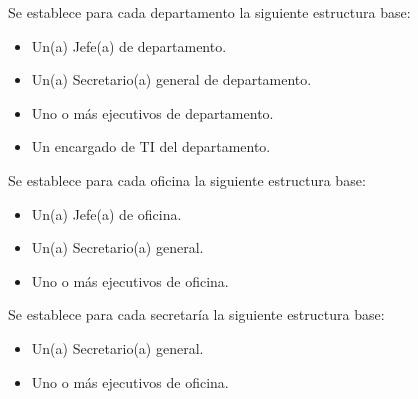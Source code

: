 Se establece para cada departamento la siguiente estructura base:
\begin{itemize}
	\item Un(a) Jefe(a) de departamento.
	\item Un(a) Secretario(a) general de departamento.
	\item Uno o más ejecutivos de departamento.
	\item Un encargado de TI del departamento.
\end{itemize}


Se establece para cada oficina la siguiente estructura base:
\begin{itemize}
	\item Un(a) Jefe(a) de oficina.
	\item Un(a) Secretario(a) general.
	\item Uno o más ejecutivos de oficina.
\end{itemize}

Se establece para cada secretaría la siguiente estructura base:
\begin{itemize}
	\item Un(a) Secretario(a) general.
	\item Uno o más ejecutivos de oficina.
\end{itemize}

